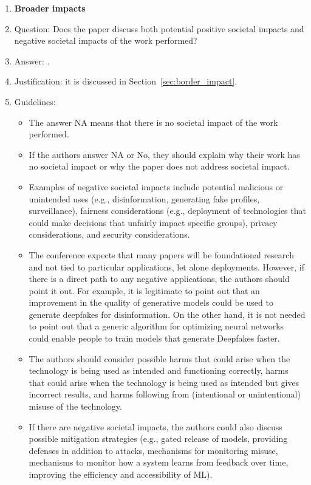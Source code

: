 \documentclass{article}
\begin{document}
{\begin{enumerate}
\item {\bf Broader impacts}
    \item[] Question: Does the paper discuss both potential positive societal impacts and negative societal impacts of the work performed?
    \item[] Answer: \answerYes{}.
    \item[] Justification: it is discussed in Section~\ref{sec:border_impact}.
    \item[] Guidelines:
    \begin{itemize}
        \item The answer NA means that there is no societal impact of the work performed.
        \item If the authors answer NA or No, they should explain why their work has no societal impact or why the paper does not address societal impact.
        \item Examples of negative societal impacts include potential malicious or unintended uses (e.g., disinformation, generating fake profiles, surveillance), fairness considerations (e.g., deployment of technologies that could make decisions that unfairly impact specific groups), privacy considerations, and security considerations.
        \item The conference expects that many papers will be foundational research and not tied to particular applications, let alone deployments. However, if there is a direct path to any negative applications, the authors should point it out. For example, it is legitimate to point out that an improvement in the quality of generative models could be used to generate deepfakes for disinformation. On the other hand, it is not needed to point out that a generic algorithm for optimizing neural networks could enable people to train models that generate Deepfakes faster.
        \item The authors should consider possible harms that could arise when the technology is being used as intended and functioning correctly, harms that could arise when the technology is being used as intended but gives incorrect results, and harms following from (intentional or unintentional) misuse of the technology.
        \item If there are negative societal impacts, the authors could also discuss possible mitigation strategies (e.g., gated release of models, providing defenses in addition to attacks, mechanisms for monitoring misuse, mechanisms to monitor how a system learns from feedback over time, improving the efficiency and accessibility of ML).
    \end{itemize}
    

\end{enumerate}}
\end{document}
